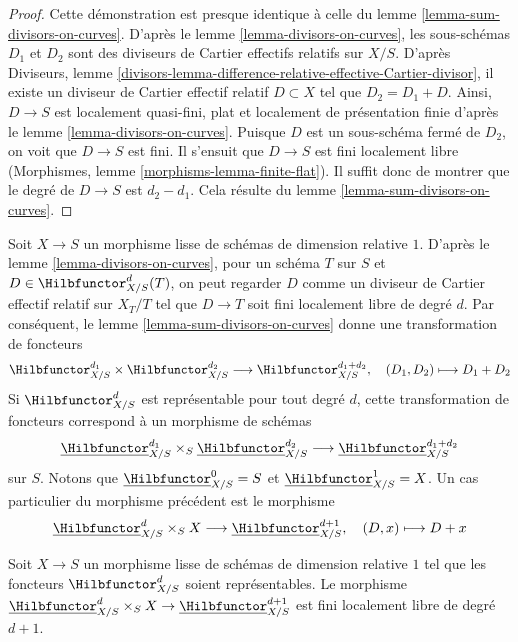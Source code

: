 \begin{proof}
Cette démonstration est presque identique à celle du
lemme \ref{lemma-sum-divisors-on-curves}.
D'après le lemme \ref{lemma-divisors-on-curves}, les sous-schémas $D_1$
et $D_2$ sont des diviseurs de Cartier effectifs relatifs sur $X/S$.
D'après Diviseurs, lemme
\ref{divisors-lemma-difference-relative-effective-Cartier-divisor},
il existe un diviseur de Cartier effectif relatif $D \subset X$
tel que $D_2 = D_1 + D$. Ainsi, $D \to S$ est localement quasi-fini, plat et
localement de présentation finie d'après le
lemme \ref{lemma-divisors-on-curves}.
Puisque $D$ est un sous-schéma fermé de $D_2$, on voit que
$D \to S$ est fini. Il s'ensuit que $D \to S$ est fini localement libre
(Morphismes, lemme \ref{morphisms-lemma-finite-flat}).
Il suffit donc de montrer que le degré de $D \to S$ est $d_2 - d_1$.
Cela résulte du lemme \ref{lemma-sum-divisors-on-curves}.
\end{proof}

\noindent
Soit $X \to S$ un morphisme lisse de schémas de dimension relative $1$.
D'après le lemme \ref{lemma-divisors-on-curves}, pour un schéma $T$ sur $S$ et
$D \in \Hilbfunctor^d_{X/S}(T)$, on peut regarder $D$ comme un diviseur de Cartier
effectif relatif sur $X_T/T$ tel que $D \to T$ soit fini
localement libre de degré $d$. Par conséquent, le
lemme \ref{lemma-sum-divisors-on-curves} donne une transformation
de foncteurs
$$
\Hilbfunctor^{d_1}_{X/S} \times \Hilbfunctor^{d_2}_{X/S}
\longrightarrow
\Hilbfunctor^{d_1 + d_2}_{X/S},\quad
(D_1, D_2) \longmapsto D_1 + D_2
$$
Si $\Hilbfunctor^d_{X/S}$ est représentable pour tout degré $d$, cette
transformation de foncteurs correspond à un morphisme de schémas
$$
\underline{\Hilbfunctor}^{d_1}_{X/S}
\times_S
\underline{\Hilbfunctor}^{d_2}_{X/S}
\longrightarrow
\underline{\Hilbfunctor}^{d_1 + d_2}_{X/S}
$$
sur $S$. Notons que $\underline{\Hilbfunctor}^0_{X/S} = S$ et
$\underline{\Hilbfunctor}^1_{X/S} = X$.
Un cas particulier du morphisme précédent est le morphisme
$$
\underline{\Hilbfunctor}^d_{X/S} \times_S X
\longrightarrow
\underline{\Hilbfunctor}^{d + 1}_{X/S},\quad
(D, x) \longmapsto D + x
$$

\begin{lemma}
\label{lemma-universal-object}
Soit $X \to S$ un morphisme lisse de schémas de dimension relative $1$
tel que les foncteurs $\Hilbfunctor^d_{X/S}$ soient représentables. Le morphisme
$\underline{\Hilbfunctor}^d_{X/S} \times_S X \to
\underline{\Hilbfunctor}^{d + 1}_{X/S}$
est fini localement libre de degré $d + 1$.
\end{lemma}

